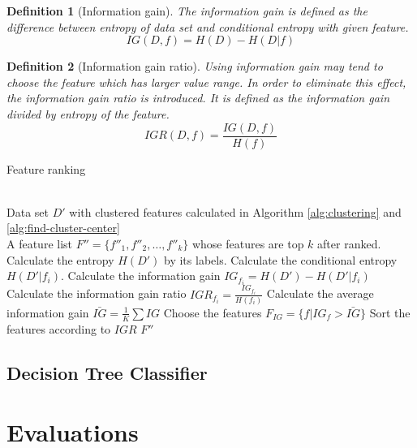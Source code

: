 \documentclass[journal]{IEEEtran}
\newtheorem{definition}{Definition}
\begin{document}
\begin{definition}[Information gain]
The information gain is defined as the difference between entropy of data set and conditional entropy with given feature.
\begin{equation}
    IG(D, f) = H(D) - H(D|f)
\end{equation}
\end{definition}

\begin{definition}[Information gain ratio]
Using information gain may tend to choose the feature which has larger value range. In order to eliminate this effect, the information gain ratio is introduced. It is defined as the information gain divided by entropy of the feature. 
\begin{equation}
    IGR(D, f) = \frac{IG(D, f)}{H(f)}
\end{equation}
\end{definition}

\begin{algorithm}
\caption{Feature ranking}
\label{alg:feature-ranking}
\begin{algorithmic}[1]
\REQUIRE ~~\\
    Data set $D'$ with clustered features calculated in Algorithm \ref{alg:clustering} and \ref{alg:find-cluster-center}
\ENSURE ~~\\
    A feature list $F''=\{f''_1, f''_2, \ldots, f''_k\}$ whose features are top $k$ after ranked. 
\STATE Calculate the entropy $H(D')$ by its labels.
    \STATE Calculate the conditional entropy $H(D'|f_i)$.
    \STATE Calculate the information gain $IG_{f_i} = H(D') - H(D'|f_i)$
    \STATE Calculate the information gain ratio $IGR_{f_i} = \frac{IG_{f_i}}{H(f_i)}$
\ENDFOR
\STATE Calculate the average information gain $\bar{IG}=\frac{1}{K}\sum IG$
\STATE Choose the features $F_{IG}=\{f|IG_{f} > \bar{IG}\}$
\STATE Sort the features according to $IGR$
\RETURN $F''$
\end{algorithmic}
\end{algorithm}

\subsection{Decision Tree Classifier}



\section{Evaluations}
\label{sec:evaluation}
\end{document}
